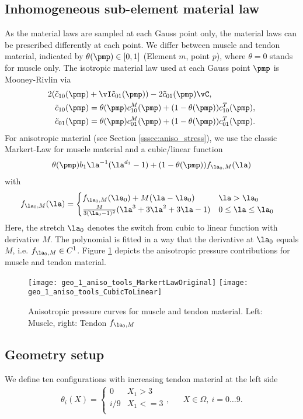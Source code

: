 \subsection{Inhomogeneous sub-element material law}
As the material laws are sampled at each Gauss point only, the material laws can be prescribed differently at each point.
We differ between muscle and tendon material, indicated by $\theta(\pmp) \in [0,1]$ (Element $m$, point $p$), where $\theta=0$ stands for muscle only.  
The isotropic material law used at each Gauss point $\pmp$ is Mooney-Rivlin via 
\begin{align}
	2(\tilde c_{10}(\pmp) &+ \vI \tilde c_{01}(\pmp))- 2\tilde c_{01}(\pmp)\vC,\\
	 \tilde c_{10}(\pmp) &= \theta(\pmp) c^M_{10}(\pmp) + (1-\theta(\pmp))c^T_{10}(\pmp),\\
	 \tilde c_{01}(\pmp) &= \theta(\pmp) c^M_{01}(\pmp) + (1-\theta(\pmp))c^T_{01}(\pmp).
\end{align}
For anisotropic material (see Section \ref{sssec:aniso_stress}), we use the classic Markert-Law \cite{Markert2005}
for muscle material and a cubic/linear function
\begin{align}
	\theta(\pmp)b_1\la^{-1}(\la^{d_1} - 1) + (1-\theta(\pmp))f_{\la_0,M}(\la)
\end{align}
with
\begin{align}
	f_{\la_0,M}(\la) &= \begin{cases}
		f_{\la_0,M}(\la_0) + M(\la-\la_0) & \la > \la_0\\
		\frac{M}{3(\la_0-1)^2}(\la^3+3\la^2+3\la-1)& 0 \leq \la \leq \la_0
	\end{cases}
\end{align}
Here, the stretch $\la_0$ denotes the switch from cubic to linear function with derivative $M$.
The polynomial is fitted in a way that the derivative at $\la_0$ equals $M$, i.e. $f_{\la_0,M}\in C^1$.
Figure \ref{fig:aniso_pressure} depicts the anisotropic pressure contributions for muscle and tendon material.
\begin{figure}[!ht]
	\texttt{[image: geo\_1\_aniso\_tools\_MarkertLawOriginal]}
	\texttt{[image: geo\_1\_aniso\_tools\_CubicToLinear]}
	\caption{Anisotropic pressure curves for muscle and tendon material. Left: Muscle, right: Tendon $f_{\la_0,M}$ }
	\label{fig:aniso_pressure}
\end{figure}
\subsection{Geometry setup}
We define ten configurations with increasing tendon material at the left side
\begin{align}
	\theta_i(X) = \begin{cases}
		0 & X_1 > 3\\
		i/9 & X_1 <= 3\\
	\end{cases}, && X\in\Omega,~i=0\ldots 9.
\end{align}
